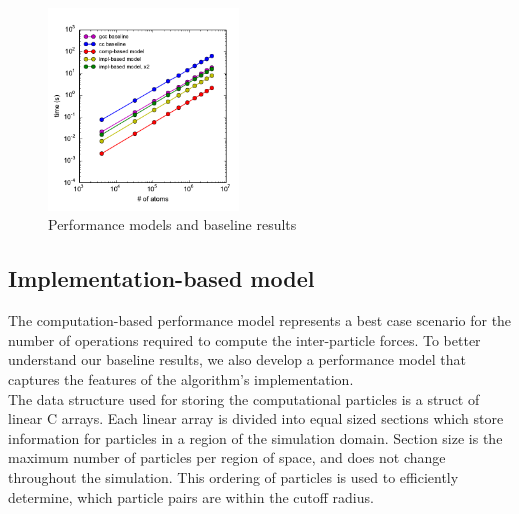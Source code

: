 \documentclass[12pt]{article}
\begin{document}
\begin{figure}[h!]
  \centering
  \includegraphics[width=0.45\textwidth]{../figs/compiler_forceLJ.pdf}
  \caption{Performance models and baseline results}
  \label{fig:perf-models}
\end{figure}

\subsection{Implementation-based model}
The computation-based performance model represents a best case scenario 
for the number of operations required to compute the inter-particle forces. 
To better understand our baseline results, we also develop a performance model 
that captures the features of the algorithm's implementation. \\

 The data structure used for storing the computational particles is a
struct of linear C arrays. Each linear array is divided into equal sized sections which 
store information for particles in a region of the simulation domain. 
Section size is the maximum number of particles per region of space, 
and does not change throughout the simulation. 
This ordering of particles is used to efficiently determine, which particle pairs are within 
the cutoff radius. \\
\end{document}
